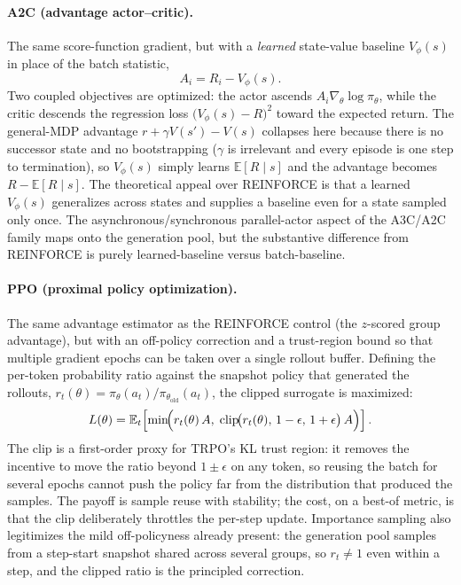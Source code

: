 \paragraph{A2C (advantage actor--critic).}
The same score-function gradient, but with a \emph{learned} state-value baseline
$V_\phi(s)$ in place of the batch statistic,
\begin{equation}
  A_i = R_i - V_\phi(s).
\end{equation}
Two coupled objectives are optimized: the actor ascends
$A_i \nabla_\theta \log \pi_\theta$, while the critic descends the regression loss
$\bigl(V_\phi(s) - R\bigr)^2$ toward the expected return. The general-MDP
advantage $r + \gamma V(s') - V(s)$ collapses here because there is no successor
state and no bootstrapping ($\gamma$ is irrelevant and every episode is one step
to termination), so $V_\phi(s)$ simply learns $\mathbb{E}[R \mid s]$ and the
advantage becomes $R - \mathbb{E}[R \mid s]$. The theoretical appeal over
REINFORCE is that a learned $V_\phi(s)$ generalizes across states and supplies a
baseline even for a state sampled only once. The asynchronous/synchronous
parallel-actor aspect of the A3C/A2C family maps onto the generation pool, but
the substantive difference from REINFORCE is purely learned-baseline versus
batch-baseline.

\paragraph{PPO (proximal policy optimization).}
The same advantage estimator as the REINFORCE control (the $z$-scored group
advantage), but with an off-policy correction and a trust-region bound so that
multiple gradient epochs can be taken over a single rollout buffer. Defining the
per-token probability ratio against the snapshot policy that generated the
rollouts, $r_t(\theta) = \pi_\theta(a_t) / \pi_{\theta_{\mathrm{old}}}(a_t)$, the
clipped surrogate is maximized:
\begin{equation}
  L(\theta) = \mathbb{E}_t\!\left[
    \min\!\Bigl(r_t(\theta)\, A,\;
    \operatorname{clip}\!\bigl(r_t(\theta),\, 1-\epsilon,\, 1+\epsilon\bigr)\, A
    \Bigr)
  \right].
\end{equation}
The clip is a first-order proxy for TRPO's KL trust region: it removes the
incentive to move the ratio beyond $1 \pm \epsilon$ on any token, so reusing the
batch for several epochs cannot push the policy far from the distribution that
produced the samples. The payoff is sample reuse with stability; the cost, on a
best-of metric, is that the clip deliberately throttles the per-step update.
Importance sampling also legitimizes the mild off-policyness already present:
the generation pool samples from a step-start snapshot shared across several
groups, so $r_t \neq 1$ even within a step, and the clipped ratio is the
principled correction.

